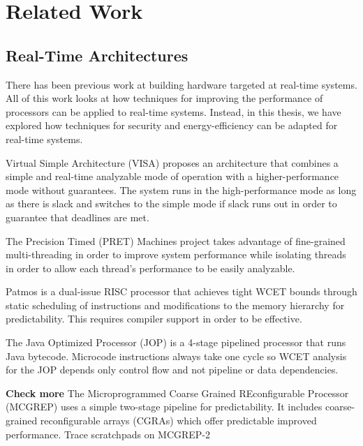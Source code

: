 \chapter{Related Work}
\label{chap:related_work}

\section{Real-Time Architectures}
\label{sec:related_work.realtime}

There has been previous work at building hardware targeted at real-time
systems. All of this work looks at how techniques for improving the performance
of processors can be applied to real-time systems. Instead, in this thesis, we
have explored how techniques for security and energy-efficiency can be adapted
for real-time systems.

Virtual Simple Architecture (VISA) \cite{visa-isca03,
multi_task_visa-rtss04} proposes an architecture that combines a simple and
real-time analyzable mode of operation with a higher-performance mode
without guarantees. The system runs in the high-performance mode as long as
there is slack and switches to the simple mode if slack runs out in order to
guarantee that deadlines are met.

The Precision Timed (PRET) Machines project \cite{pret-dac07, pret-cases08,
ptarm-iccd12, flexpret-rtas14} takes advantage of fine-grained multi-threading
in order to improve system performance while isolating threads in order to
allow each thread's performance to be easily analyzable.

Patmos \cite{patmos-ppes2011} is a dual-issue RISC processor that achieves
tight WCET bounds through static scheduling of instructions and modifications
to the memory hierarchy for predictability. This requires compiler support in
order to be effective.

The Java Optimized Processor (JOP) \cite{jop-jsa07} is a 4-stage pipelined
processor that runs Java bytecode. Microcode instructions always take one cycle
so WCET analysis for the JOP depends only control flow and not pipeline or data
dependencies.

\textbf{Check more}
The Microprogrammed Coarse Grained REconfigurable Processor (MCGREP)
\cite{mcgrep-rtss06} uses a simple two-stage pipeline for predictability. It
includes coarse-grained reconfigurable arrays (CGRAs) which offer predictable
improved performance. Trace scratchpads on MCGREP-2 \cite{mcgrep2-rtas08}

